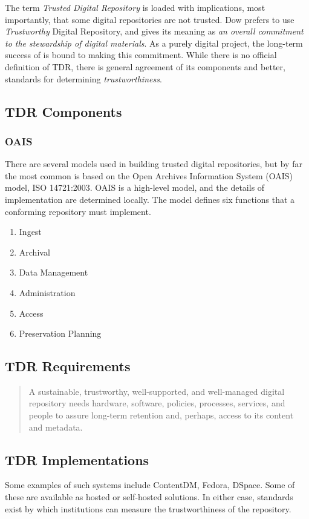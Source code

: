 The term \emph{Trusted Digital Repository} is loaded with implications, most importantly, that some digital repositories are not trusted. Dow prefers to use \emph{Trustworthy} Digital Repository, and gives its meaning as \emph{an overall commitment to the stewardship of digital materials}\cite{dow_elizabeth_2009}. As a purely digital project, the long-term success of \projectname is bound to making this commitment. While there is no official definition\cite{dow_elizabeth_2009} of TDR, there is general agreement of its components and better, standards for determining \emph{trustworthiness}.
\subsection{TDR Components}
\subsubsection{OAIS}
There are several models used in building trusted digital repositories, but by far the most common is based on the Open Archives Information System (OAIS) model, ISO 14721:2003. OAIS is a high-level model, and the details of implementation are determined locally. The model defines six functions that a conforming repository must implement.
\begin{enumerate}
  \item{Ingest}
  \item{Archival}
  \item{Data Management}
  \item{Administration}
  \item{Access}
  \item{Preservation Planning}
\end{enumerate}

\subsection{TDR Requirements}
\begin{quote}A sustainable, trustworthy, well-supported, and well-managed digital repository needs hardware, software, policies, processes, services, and people to assure long-term retention and, perhaps, access to its content and metadata.\cite{dow_elizabeth_2009} \end{quote}

\subsection{TDR Implementations}
Some examples of such systems include ContentDM, Fedora, DSpace. Some of these are available as hosted or self-hosted solutions. In either case, standards exist  by which institutions can measure the trustworthiness of the repository.